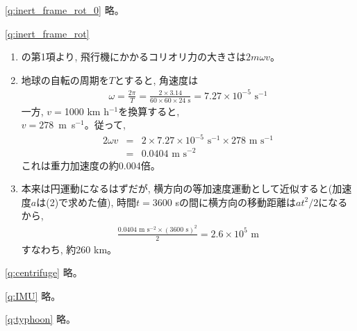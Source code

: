 \ref{q:inert_frame_rot_0} 略。\mv

\ref{q:inert_frame_rot}
\begin{enumerate}
\item {}の第1項より, 飛行機にかかるコリオリ力の大きさは$2m\omega v$。
\item 地球の自転の周期を$T$とすると, 角速度は
\begin{eqnarray*}\omega=\frac{2\pi}{T}=\frac{2\times3.14}{60\times60\times24\text{ s}}=7.27\times10^{-5}\text{ s}^{-1}
\end{eqnarray*}
一方, $v=$1000 km h$^{-1}$を換算すると, \\$v=278$~m~s$^{-1}$。従って, 
\begin{eqnarray*}
2\omega v&=&2\times7.27\times10^{-5}\text{ s}^{-1}\times278\text{ m s}^{-1}\\
          &=&0.0404\text{ m s}^{-2}
\end{eqnarray*}
これは重力加速度の約0.004倍。
\item 本来は円運動になるはずだが, 横方向の等加速度運動として近似すると(加速度$a$は(2)で求めた値), 
時間$t=3600$ sの間に横方向の移動距離は$at^2/2$になるから, 
\begin{eqnarray*}
\frac{0.0404\text{ m s}^{-2}\times (3600 \text{ s})^2}{2}=2.6\times10^5\,\,\text{m}
\end{eqnarray*}
すなわち, 約260 km。
\end{enumerate}

\ref{q:centrifuge} 略。\mv

\ref{q:IMU} 略。\mv

\ref{q:typhoon} 略。\mv

